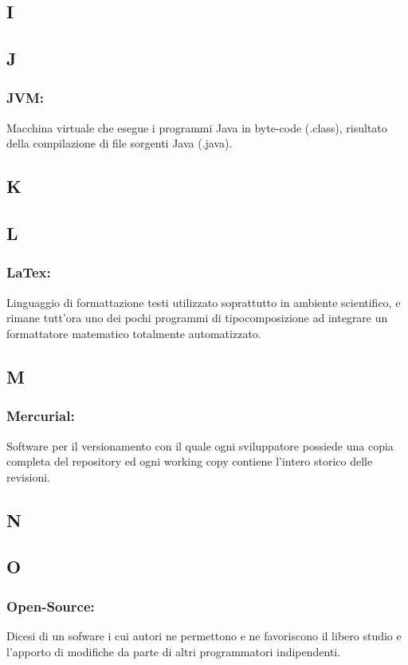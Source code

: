 \subsection*{I}
\subsection*{J}
\subsubsection*{JVM:} Macchina virtuale che esegue i programmi Java in byte-code
(.class), risultato della compilazione di file sorgenti Java (.java).
\subsection*{K}
\subsection*{L}
\subsubsection*{LaTex:} Linguaggio di formattazione testi utilizzato
soprattutto in ambiente scientifico, e rimane tutt'ora uno dei pochi programmi
di tipocomposizione ad integrare un formattatore matematico totalmente automatizzato.
\subsection*{M}
\subsubsection*{Mercurial:} Software per il versionamento con il quale
ogni sviluppatore possiede una copia completa del repository ed ogni working copy contiene l'intero storico delle revisioni. \subsection*{N}
\subsection*{O}
\subsubsection*{Open-Source:} Dicesi di un sofware i cui autori ne permettono e
ne favoriscono il libero studio e l'apporto di modifiche da parte di altri programmatori indipendenti.
